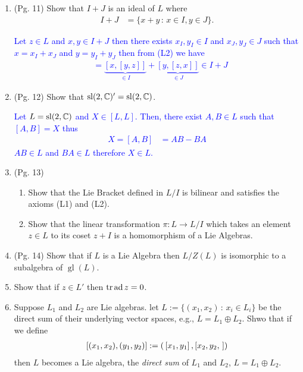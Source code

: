 \documentclass[12pt,a4paper]{report}
\newcommand{\BLUE}[1]{\textcolor{blue}{#1}}
\newcommand{\GL}{\operatorname{gl}}
\newcommand{\SL}{\operatorname{sl}}
\newcommand{\AD}{\operatorname{ad}}
\newcommand{\LB}[2]{\left [ #1,#2 \right ]}
\begin{document}
\begin{enumerate}[label=2.\arabic*]

\item (Pg. 11) Show that $I+J$ is an ideal of $L$ where
\begin{align*}
	I+J &=\{x+y\,:\, x \in I, y\in J\}.
\end{align*}

\BLUE{Let $z \in L$ and $x, y \in I+J$ then there exists $x_I, y_I \in I$ and $x_J, y_J \in J$ such that $x=x_I+x_J$ and $y=y_I+y_J$  then from (L2) we have
\begin{align*}
	[\underbrace{[y,x]}_{\in I+J}, z] &= \underbrace{[x, [y,z]]}_{\in I} + \underbrace{[y,[z,x]]}_{\in J}  \in I+J
\end{align*}
}

\item (Pg. 12) Show that $\SL(2, \C)' = \SL(2, \C)$.

\BLUE{Let $L = \SL(2, \C)$ and $X \in [L, L]$.  Then, there exist $A,B \in L$ such that $[A,B] = X$ thus
\begin{align*}
	X = [A,B] &= AB - BA
\end{align*}$AB \in L$ and $BA \in L$ therefore $X \in L$.
}

\item (Pg. 13) \begin{enumerate}[label=(\roman*)]
	\item Show that the Lie Bracket defined in $L/I$ is bilinear and satisfies the axioms (L1) and (L2).
	\item Show that the linear transformation $\pi : L \to L/I$ which takes an element $z \in L$ to its coset $z+I$ is a homomorphism of a Lie Algebras.

\end{enumerate}

\item (Pg. 14) Show that if $L$ is a Lie Algebra then $L/Z(L)$ is isomorphic to a subalgebra of $\GL(L)$.

\item Show that if $z \in L'$ then $\TR \AD z = 0$.

\item Suppose $L_1$ and $L_2$ are Lie algebras.  let $L := \{(x_1,x_2)\,:\, x_i \in L_i\}$ be the direct sum of their underlying vector spaces, e.g., $L = L_1 \oplus L_2$.  Shwo that if we define
\begin{align*}
	\LB{(x_1,x_2)}{(y_1,y_2)} := \PAREN{\LB{x_1}{y_1},\LB{x_2,y_2}}
\end{align*}then $L$ becomes a Lie algebra, the \textit{direct sum} of $L_1$ and $L_2$, $L = L_1 \oplus L_2$.  
\begin{enumerate}[label=(\roman*)]


\end{enumerate}
\end{enumerate}
\end{document}
